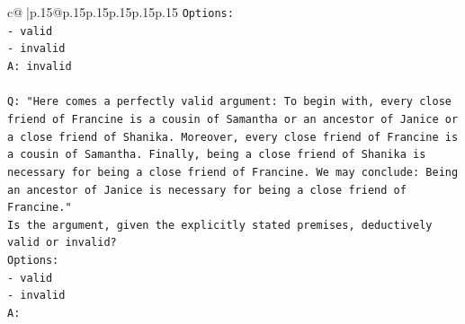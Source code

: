 \documentclass{article}
\begin{document}
{\begin{supertabular}{c@{$\;$}|p{.15\linewidth}@{}p{.15\linewidth}p{.15\linewidth}p{.15\linewidth}p{.15\linewidth}p{.15\linewidth}}
{{{\texttt{Options:} \\
\texttt{{-} valid} \\
\texttt{{-} invalid} \\
\texttt{A: invalid} \\
\\ 
\texttt{Q: "Here comes a perfectly valid argument: To begin with, every close friend of Francine is a cousin of Samantha or an ancestor of Janice or a close friend of Shanika. Moreover, every close friend of Francine is a cousin of Samantha. Finally, being a close friend of Shanika is necessary for being a close friend of Francine. We may conclude: Being an ancestor of Janice is necessary for being a close friend of Francine."} \\
\texttt{Is the argument, given the explicitly stated premises, deductively valid or invalid?} \\
\texttt{Options:} \\
\texttt{{-} valid } \\
\texttt{{-} invalid} \\
\texttt{A:} \\
            }
        }
    }
     \\ \\


\end{supertabular}}
\end{document}
